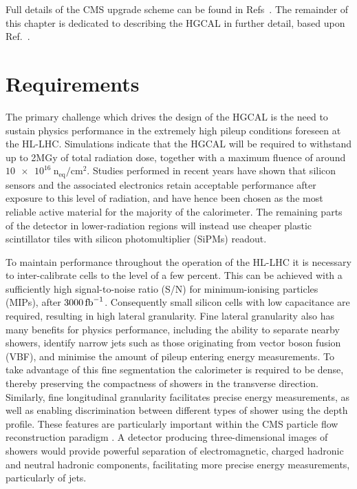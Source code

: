 Full details of the CMS upgrade scheme can be found in Refs~\cite{Tracker_Phase2TDR,Barrel_Phase2TDR,Muon_Phase2TDR,Trigger_Phase2TDR,DAQ_Phase2TDR,MTD,HGCAL}.
The remainder of this chapter is dedicated to describing the HGCAL in further detail, based upon Ref.~\cite{HGCAL}.

\section{Requirements}

The primary challenge which drives the design of the HGCAL is the need to sustain physics performance in the extremely high pileup conditions foreseen at the HL-LHC.
Simulations indicate that the HGCAL will be required to withstand up to 2MGy of total radiation dose, together with a maximum fluence of around $\SI{10e16}{\textrm{n}_{\textrm{eq}}/\textrm{cm}^2}.$
Studies performed in recent years have shown that silicon sensors and the associated electronics retain acceptable performance after exposure to this level of radiation, 
and have hence been chosen as the most reliable active material for the majority of the calorimeter.
The remaining parts of the detector in lower-radiation regions will instead use cheaper plastic scintillator tiles with silicon photomultiplier (SiPMs) readout.

To maintain performance throughout the operation of the HL-LHC it is necessary to inter-calibrate cells to the level of a few percent.
This can be achieved with a sufficiently high signal-to-noise ratio (S/N) for minimum-ionising particles (MIPs), after $\SI{3000}{\ensuremath{\textrm{fb}^{-1}}}$.
Consequently small silicon cells with low capacitance are required, resulting in high lateral granularity.
Fine lateral granularity also has many benefits for physics performance, including the ability to separate nearby showers, 
identify narrow jets such as those originating from vector boson fusion (VBF), and minimise the amount of pileup entering energy measurements.
To take advantage of this fine segmentation the calorimeter is required to be dense, thereby preserving the compactness of showers in the transverse direction.
Similarly, fine longitudinal granularity facilitates precise energy measurements, as well as enabling discrimination between different types of shower using the depth profile.
These features are particularly important within the CMS particle flow reconstruction paradigm \cite{ParticleFlow}.
A detector producing three-dimensional images of showers would provide powerful separation of electromagnetic, charged hadronic and neutral hadronic components,
facilitating more precise energy measurements, particularly of jets.

